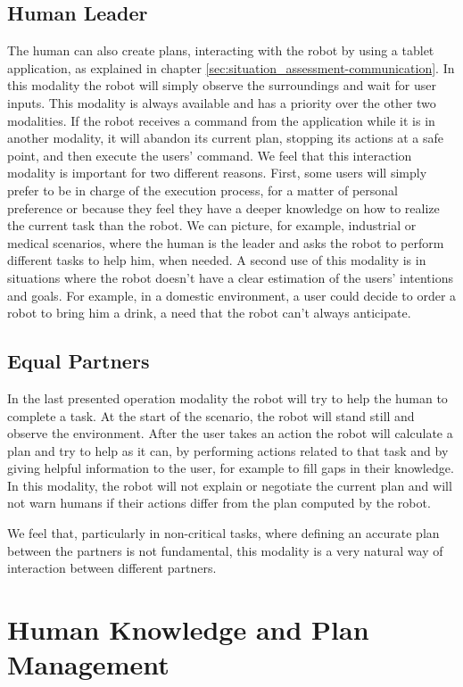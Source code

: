 \subsection{Human Leader}
The human can also create plans, interacting with the robot by using a
tablet application, as explained in chapter \ref{sec:situation_assessment-communication}. In this modality the robot   
will simply observe the surroundings and wait for user inputs. This modality is always available and has a priority over
the other two modalities. If the robot receives a command from the
application while it is in another modality, it will abandon its current
plan, stopping its actions at a safe point, and then execute the users'
command. We feel that this interaction modality is important for two
different reasons.  First, some users will simply prefer to be in
charge of the execution process, for a matter of personal preference or because they
feel they have a deeper knowledge on how to realize the current task
than the robot. We can picture, for example, industrial or medical
scenarios, where the human is the leader and asks the robot to perform
different tasks to help him, when needed. A second use of this modality is in situations where
the robot doesn't have  a clear estimation of the users' intentions and
goals. For example, in a domestic environment, a user could decide to
order a robot to bring him a drink, a need that the robot can't always anticipate.

\subsection{Equal Partners}
In the last presented operation modality the robot will try to help
the human to complete a task. At the start of the scenario, the robot
will stand still and observe the environment. After the user takes an
action the robot will calculate a plan and try to help as it can, by
performing actions related to that task and by giving helpful information to
the user, for example to fill gaps in their knowledge. In this modality, 
the robot will not explain or negotiate the current plan and will not warn humans if
their actions differ from the plan computed by the robot.

We feel that, particularly in non-critical tasks, where defining an accurate plan between the partners is not
fundamental, this modality is a very natural way of
interaction between different partners.

\section{Human Knowledge and Plan Management}
\label{sec-plan_management-human_knowledge}

